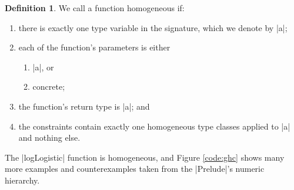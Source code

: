 \documentclass[preprint]{sigplanconf}
\theoremstyle{definition}
\newtheorem{defn}{Definition}
\newcommand{\homoiconic}{{\ttfamily homoiconic}~}
\begin{document}
\begin{defn}
We call a function homogeneous if:
\begin{enumerate}
\item
there is exactly one type variable in the signature, which we denote by |a|;
\item
each of the function's parameters is either
\begin{enumerate}
\item
|a|, or
\item
concrete;
\end{enumerate}
\item
the function's return type is |a|; and
\item
the constraints contain exactly one homogeneous type classes applied to |a| and nothing else.
\end{enumerate}
The |logLogistic| function is homogeneous,
and Figure \ref{code:ghc} shows many more examples and counterexamples taken from the |Prelude|'s numeric hierarchy.
\end{defn}



\end{document}
